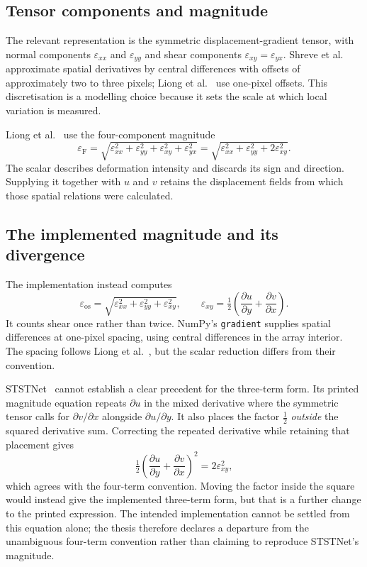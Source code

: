 \subsection{Tensor components and magnitude}
\label{sec:strain-tensor}

The relevant representation is the symmetric displacement-gradient tensor, with normal components $\varepsilon_{xx}$ and $\varepsilon_{yy}$ and shear components $\varepsilon_{xy}=\varepsilon_{yx}$. Shreve et al.~\cite{shreve2011} approximate spatial derivatives by central differences with offsets of approximately two to three pixels; Liong et al.~\cite{liong2014a} use one-pixel offsets. This discretisation is a modelling choice because it sets the scale at which local variation is measured.

Liong et al.~\cite{liong2014a,liong2014b,liong2016} use the four-component magnitude
\[
    \varepsilon_{\mathrm{F}}
    =\sqrt{\varepsilon_{xx}^{2}+\varepsilon_{yy}^{2}
        +\varepsilon_{xy}^{2}+\varepsilon_{yx}^{2}}
    =\sqrt{\varepsilon_{xx}^{2}+\varepsilon_{yy}^{2}
        +2\varepsilon_{xy}^{2}}.
\]
The scalar describes deformation intensity and discards its sign and direction. Supplying it together with $u$ and $v$ retains the displacement fields from which those spatial relations were calculated.

\subsection{The implemented magnitude and its divergence}
\label{sec:strain-divergence}

The implementation instead computes
\[
    \varepsilon_{\mathrm{os}}
    =\sqrt{\varepsilon_{xx}^{2}+\varepsilon_{yy}^{2}
        +\varepsilon_{xy}^{2}},
    \qquad
    \varepsilon_{xy}=\tfrac{1}{2}
        \left(\frac{\partial u}{\partial y}
             +\frac{\partial v}{\partial x}\right).
\]
It counts shear once rather than twice. NumPy's \texttt{gradient} supplies spatial differences at one-pixel spacing, using central differences in the array interior. The spacing follows Liong et al.~\cite{liong2014a}, but the scalar reduction differs from their convention.

STSTNet~\cite{liong2019b} cannot establish a clear precedent for the three-term form. Its printed magnitude equation repeats $\partial u$ in the mixed derivative where the symmetric tensor calls for $\partial v/\partial x$ alongside $\partial u/\partial y$. It also places the factor $\tfrac{1}{2}$ \emph{outside} the squared derivative sum. Correcting the repeated derivative while retaining that placement gives
\[
    \tfrac{1}{2}
       \left(\frac{\partial u}{\partial y}
            +\frac{\partial v}{\partial x}\right)^2
       =2\varepsilon_{xy}^{2},
\]
which agrees with the four-term convention. Moving the factor inside the square would instead give the implemented three-term form, but that is a further change to the printed expression. The intended implementation cannot be settled from this equation alone; the thesis therefore declares a departure from the unambiguous four-term convention rather than claiming to reproduce STSTNet's magnitude.

